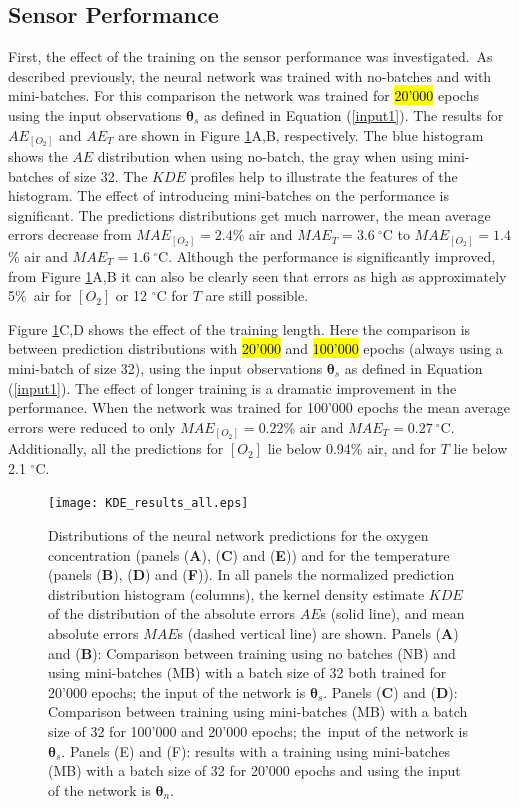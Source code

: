 \documentclass[sensors,article,accept,moreauthors,pdftex,10pt,a4paper]{Definitions/mdpi}
\begin{document}
\subsection{Sensor Performance}

First, the effect of the training on the sensor performance was investigated.~As described previously, the neural network was trained with no-batches and with mini-batches. For this comparison the network was trained for \hl{20'000} epochs using the input observations ${\pmb \theta}_s$ as defined in Equation (\ref{input1}). The results for $AE_{[O_2]}$ and $AE_T$ are shown in Figure \ref{fig:KDE_results_all}A,B, respectively. The blue histogram shows the $AE$ distribution when using no-batch, the gray when using mini-batches of size 32. The $KDE$ profiles help to illustrate the features of the histogram. The effect of introducing mini-batches on the performance is significant. The predictions distributions get much narrower, the mean average errors decrease from $MAE_{[O_2]}=2.4$\% air and $MAE_{T}=3.6 \ ^\circ$C to $MAE_{[O_2]}=1.4$\% air and $MAE_{T}=1.6 \ ^\circ$C. Although the performance is significantly improved, from Figure \ref{fig:KDE_results_all}A,B it can also be clearly seen that errors as high as approximately 5\%~air for $[O_2]$ or 12 $^\circ$C for $T$ are still possible.



Figure \ref{fig:KDE_results_all}C,D shows the effect of the training length. Here the comparison is between prediction distributions with \hl{20'000} and \hl{100'000} epochs (always using a mini-batch of size 32), using the input observations ${\pmb \theta}_s$ as defined in Equation (\ref{input1}). The effect of longer training is a dramatic improvement in the performance. When the network was trained for 100'000 epochs the mean average errors were reduced to only $MAE_{[O_2]}=0.22$\% air and $MAE_{T}=0.27  \ ^\circ$C. Additionally, all the predictions for $[O_2]$ lie below 0.94\% air, and for $T$ lie below 2.1 $^\circ$C.

\begin{figure}[H]
\centering
\texttt{[image: KDE\_results\_all.eps]}
\caption{Distributions of the neural network predictions for the oxygen concentration (panels (\textbf{A}), (\textbf{C}) and (\textbf{E})) and for the temperature (panels (\textbf{B}), (\textbf{D}) and (\textbf{F})). In all panels the normalized prediction distribution histogram (columns), the kernel density estimate $KDE$ of the distribution of the absolute errors $AE$s (solid line), and mean absolute errors $MAE$s (dashed vertical line) are shown. Panels (\textbf{A}) and (\textbf{B}): Comparison between training using no batches (NB) and using mini-batches (MB) with a batch size of 32 both trained for 20'000 epochs; the input of the network is ${\pmb \theta}_s$. Panels (\textbf{C}) and (\textbf{D}): Comparison between training using mini-batches (MB) with a batch size of 32 for 100'000 and 20'000 epochs; the~input of the network is ${\pmb \theta}_s$. Panels (E) and (F): results with a training using mini-batches (MB) with a batch size of 32 for 20'000 epochs and using the input of the network is ${\pmb \theta}_n$.}
\label{fig:KDE_results_all}
\end{figure}
\end{document}
